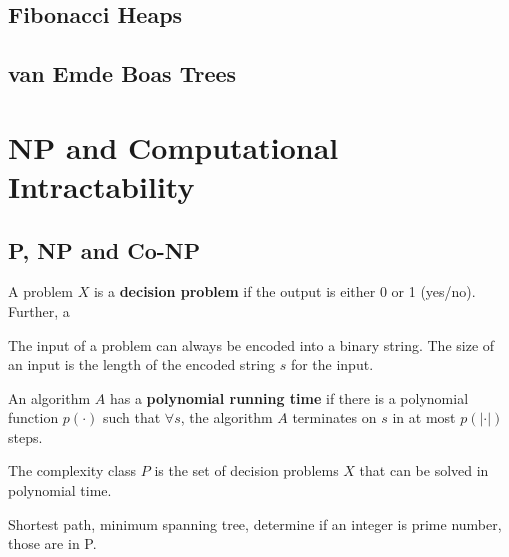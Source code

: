 			\section{Fibonacci Heaps}

			\section{van Emde Boas Trees}

		\chapter{NP and Computational Intractability}
			\section{P, NP and Co-NP}
				\begin{definition}
					A problem $X$ is a \textbf{decision problem} if the output is either 0 or 1 (yes/no). Further, a 
				\end{definition}

				The input of a problem can always be encoded into a binary string. The size of an input is the length of the encoded string $s$ for the input.


				\begin{definition}
					An algorithm $A$ has a \textbf{polynomial running time} if there is a polynomial function $p(\cdot)$ such that $\forall s$, the algorithm $A$ terminates on $s$ in at most $p(|\cdot|)$ steps.
				\end{definition}

				\begin{definition}[P]
					The complexity class $P$ is the set of decision problems $X$ that can be solved in polynomial time.
				\end{definition}

				\begin{example}
					Shortest path, minimum spanning tree, determine if an integer is prime number, those are in P.
				\end{example}

